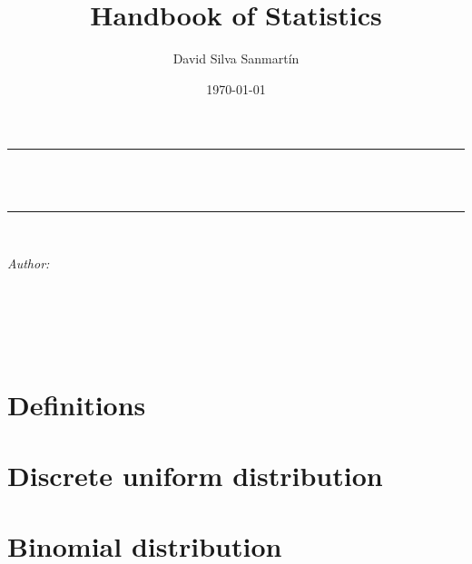 \documentclass[12pt]{article}
\title{Handbook of Statistics}
\author{David Silva Sanmartín}
\date{\today}
\makeatletter
\theoremstyle{definition}
\let\thetitle\@title
\let\theauthor\@author
\let\thedate\@date
\makeatother
\begin{document}
	\nocite{*}

	
	\begin{titlepage}
		\centering
		\vspace*{0.5 cm}
		\rule{\linewidth}{0.2 mm} \\[0.4 cm]
		{ \huge \bfseries \thetitle}\\
		\rule{\linewidth}{0.2 mm} \\[1.5 cm]
		
		\begin{minipage}{0.4\textwidth}
			\begin{flushleft} \large
				\emph{Author:}\\
				\theauthor
			\end{flushleft}
		\end{minipage}~
		\begin{minipage}{0.4\textwidth}
			\begin{flushright} \large
			\end{flushright}
		\end{minipage}\\[2 cm]
		
		{\large \thedate}\\[2 cm]
		
		\vfill
		
	\end{titlepage}
	
	
	\tableofcontents
	\pagebreak
	
	
	\section{Definitions}
	
	
	\section{Discrete uniform distribution}
	
	
	\section{Binomial distribution}
	
	
	
	
\end{document}
